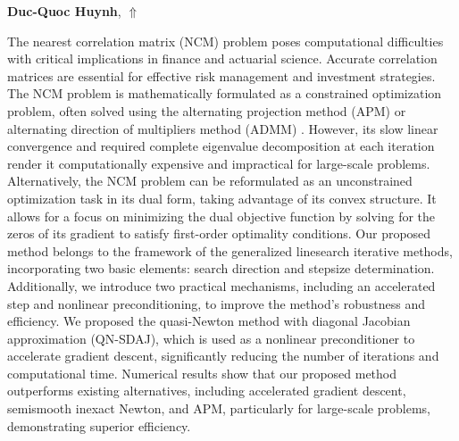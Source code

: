 \documentclass[ILAS2025-program.tex]{subfiles}
\begin{document}
\hypertarget{down0411}{}\begin{ilasabstract}
    
\textbf{Duc-Quoc Huynh},  \hfill \hyperlink{up0411}{$\Uparrow$}
    
    
\mtskip
    The nearest correlation matrix (NCM) problem poses computational difficulties with critical implications in finance and actuarial science. Accurate correlation matrices are essential for effective risk management and investment strategies.  
The NCM problem is mathematically formulated as a constrained optimization problem, often solved using the alternating projection method (APM) or alternating direction of multipliers method (ADMM) . However, its slow linear convergence and required complete eigenvalue decomposition at each iteration render it computationally expensive and impractical for large-scale problems. Alternatively, the NCM problem can be reformulated as an unconstrained optimization task in its dual form, taking advantage of its convex structure. It allows for a focus on minimizing the dual objective function by solving for the zeros of its gradient to satisfy first-order optimality conditions. Our proposed method belongs to the framework of the generalized linesearch iterative methods, incorporating two basic elements: search direction and stepsize determination. Additionally, we introduce two practical mechanisms, including an accelerated step and nonlinear preconditioning, to improve the method's robustness and efficiency.
We proposed the quasi-Newton method with diagonal Jacobian approximation (QN-SDAJ), which is used as a nonlinear preconditioner to accelerate gradient descent, significantly reducing the number of iterations and computational time. Numerical results show that our proposed method outperforms existing alternatives, including accelerated gradient descent, semismooth inexact Newton, and APM, particularly for large-scale problems, demonstrating superior efficiency.
\end{ilasabstract}
    
\end{document}
